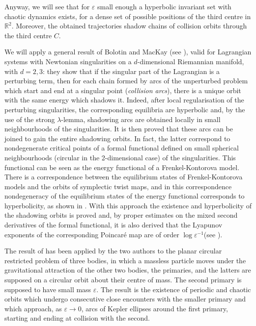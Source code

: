 \documentclass[a4paper]{article}
\begin{document}
Anyway, we will see that for $\varepsilon$ small enough a hyperbolic
invariant set with chaotic dynamics exists, for a dense set of
possible positions of the third centre in ${\mathbb{R}}^2$.  Moreover, the
obtained trajectories shadow chains of collision orbits through
the third centre $C$.
  
We will apply a general result of Bolotin and MacKay (see \cite{BM1}),
valid for Lagrangian systems with Newtonian singularities on a
$d$-dimensional Riemannian manifold, with $d=2,3$: they show that if
the singular part of the Lagrangian is a perturbing term, then for
each chain formed by arcs of the unperturbed problem which start and
end at a singular point (\emph{collision arcs}), there is a unique
orbit with the same energy which shadows it.
Indeed, after local regularisation of the perturbing singularities,
the corresponding equilibria are hyperbolic and, by the use of the
strong $\lambda$-lemma, shadowing arcs are obtained locally in small
neighbourhoods of the singularities. It is then proved
that these arcs can be joined to gain the entire shadowing orbits.
In fact, the latter correspond to nondegenerate critical points of a formal
functional defined on small spherical neighbourhoods (circular in the
2-dimensional case) of the singularities. This functional can be seen
as the energy functional of a Frenkel-Kontorova model. There is a
correspondence between the equilibrium states of Frenkel-Kontorova
models and the orbits of symplectic twist maps, and in this
correspondence nondegeneracy of the equilibrium states of the energy
functional corresponds to hyperbolicity, as shown in \cite{AMB}.
With this approach the existence and hyperbolicity of the shadowing
orbits is proved and, by proper estimates on the mixed second
derivatives of the formal functional, it is also derived that the
Lyapunov exponents of the corresponding Poincar\'e map are of order
$\log \varepsilon^{-1}$(see \cite{BM2}).

The result of \cite{BM1} has been applied by the two authors to 
the planar circular restricted problem of three bodies, in which a
massless particle moves under the gravitational attraction of the
other two bodies, the primaries, and the latters are supposed on a
circular orbit about their centre of mass.  The second primary is
supposed to have small mass $\varepsilon$.  The result is the
existence of periodic and chaotic orbits which undergo consecutive
close encounters with the smaller primary and which approach, as
$\varepsilon \rightarrow 0$, arcs of Kepler ellipses around the first
primary, starting and ending at collision with the second.
\end{document}
